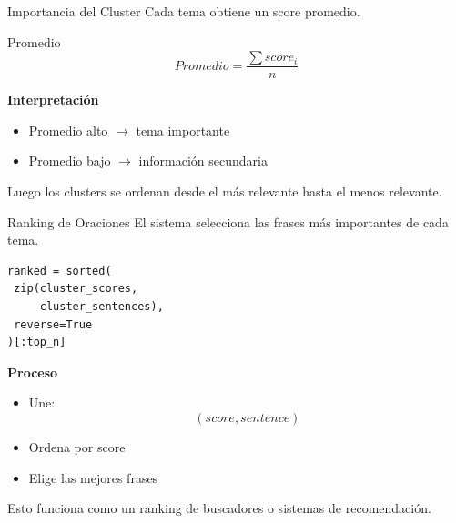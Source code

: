 
\begin{frame}{Importancia del Cluster}
Cada tema obtiene un score promedio.

\vspace{0.4em}

\begin{block}{Promedio}
\[
Promedio =
\frac{\sum score_i}{n}
\]
\end{block}

\vspace{0.4em}

\textbf{Interpretación}

\begin{itemize}
    \item Promedio alto
    $\rightarrow$
    tema importante
    \item Promedio bajo
    $\rightarrow$
    información secundaria
\end{itemize}

\vspace{0.4em}

Luego los clusters se ordenan desde el más relevante
hasta el menos relevante.

\end{frame}


\begin{frame}[fragile]{Ranking de Oraciones}
El sistema selecciona las frases más importantes
de cada tema.

\vspace{0.4em}

\begin{verbatim}
ranked = sorted(
 zip(cluster_scores,
     cluster_sentences),
 reverse=True
)[:top_n]
\end{verbatim}

\vspace{0.4em}

\textbf{Proceso}

\begin{itemize}
    \item Une:
    \[
    (score, sentence)
    \]
    \item Ordena por score
    \item Elige las mejores frases
\end{itemize}

\vspace{0.4em}

Esto funciona como un ranking de buscadores
o sistemas de recomendación.

\end{frame}